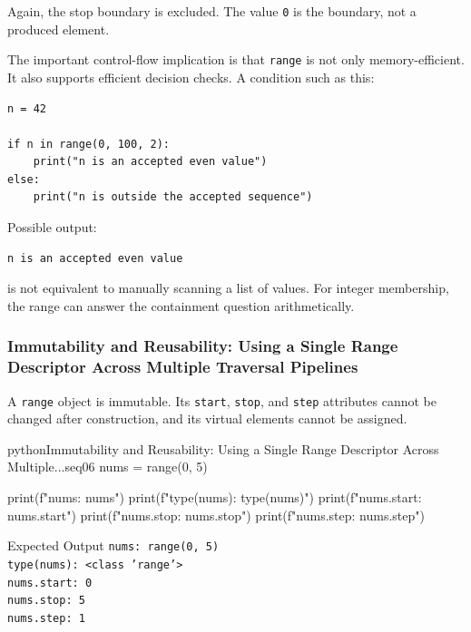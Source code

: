 Again, the stop boundary is excluded. The value \texttt{0} is the boundary, not a produced element.

The important control-flow implication is that \texttt{range} is not only memory-efficient. It also supports efficient decision checks. A condition such as this:

\begin{verbatim}
n = 42

if n in range(0, 100, 2):
    print("n is an accepted even value")
else:
    print("n is outside the accepted sequence")
\end{verbatim}

Possible output:

\begin{verbatim}
n is an accepted even value
\end{verbatim}

is not equivalent to manually scanning a list of values. For integer membership, the range can answer the containment question arithmetically.

\subsubsection{Immutability and Reusability: Using a Single Range Descriptor Across Multiple Traversal Pipelines}

A \texttt{range} object is immutable. Its \texttt{start}, \texttt{stop}, and \texttt{step} attributes cannot be changed after construction, and its virtual elements cannot be assigned.

\begin{codebox}[]{python}{Immutability and Reusability: Using a Single Range Descriptor Across Multiple...}{seq06}
nums = range(0, 5)

print(f"nums: {nums}")
print(f"type(nums): {type(nums)}")
print(f"nums.start: {nums.start}")
print(f"nums.stop: {nums.stop}")
print(f"nums.step: {nums.step}")
\end{codebox}


\begin{iobox}{Expected Output}
\texttt{nums: range(0, 5)} \\
\texttt{type(nums): <class 'range'>} \\
\texttt{nums.start: 0} \\
\texttt{nums.stop: 5} \\
\texttt{nums.step: 1} \\
\end{iobox}



